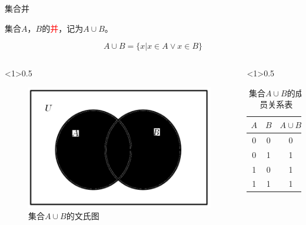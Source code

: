 \documentclass[xetex,10pt,aspectratio=43]{beamer}
\begin{document}
	\begin{frame}{集合并}
	
		集合$A$，$B$的\textcolor{red}{并}，记为$A\cup B$。
		
		$$A\cup B=\{x|x\in A\vee x\in B\}$$
	
		\begin{columns}
		
			\begin{column}<1>{0.5\textwidth}
			
				\begin{figure}
					
					\centering
					
					\includegraphics[scale=0.5]{1.png}
					
					\caption{集合$A\cup B$的文氏图}
				
				\end{figure}
			
			\end{column}
		
			\begin{column}<1>{0.5\textwidth}
			
				\begin{table}
				
					\centering
				
					\begin{tabular}{|c|c|c|}
						\hline
						$A$ & $B$ & $A\cup B$\\
						\hline
						0 & 0 & 0\\
						\hline
						0 & 1 & 1\\
						\hline
						1 & 0 & 1\\
						\hline
						1 & 1 & 1\\
						\hline
					\end{tabular}
				
					\caption{集合$A\cup B$的成员关系表}
				
				\end{table}
			
			\end{column}
		
		\end{columns}
	
	\end{frame}	
\end{document}
